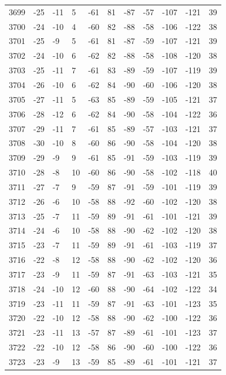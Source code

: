 \begin{table}[H]
\begin{tabular}{lllllllllll}
3699 & -25 & -11 & 5 & -61 & 81 & -87 & -57 & -107 & -121 & 39 \\
3700 & -24 & -10 & 4 & -60 & 82 & -88 & -58 & -106 & -122 & 38 \\
3701 & -25 & -9 & 5 & -61 & 81 & -87 & -59 & -107 & -121 & 39 \\
3702 & -24 & -10 & 6 & -62 & 82 & -88 & -58 & -108 & -120 & 38 \\
3703 & -25 & -11 & 7 & -61 & 83 & -89 & -59 & -107 & -119 & 39 \\
3704 & -26 & -10 & 6 & -62 & 84 & -90 & -60 & -106 & -120 & 38 \\
3705 & -27 & -11 & 5 & -63 & 85 & -89 & -59 & -105 & -121 & 37 \\
3706 & -28 & -12 & 6 & -62 & 84 & -90 & -58 & -104 & -122 & 36 \\
3707 & -29 & -11 & 7 & -61 & 85 & -89 & -57 & -103 & -121 & 37 \\
3708 & -30 & -10 & 8 & -60 & 86 & -90 & -58 & -104 & -120 & 38 \\
3709 & -29 & -9 & 9 & -61 & 85 & -91 & -59 & -103 & -119 & 39 \\
3710 & -28 & -8 & 10 & -60 & 86 & -90 & -58 & -102 & -118 & 40 \\
3711 & -27 & -7 & 9 & -59 & 87 & -91 & -59 & -101 & -119 & 39 \\
3712 & -26 & -6 & 10 & -58 & 88 & -92 & -60 & -102 & -120 & 38 \\
3713 & -25 & -7 & 11 & -59 & 89 & -91 & -61 & -101 & -121 & 39 \\
3714 & -24 & -6 & 10 & -58 & 88 & -90 & -62 & -102 & -120 & 38 \\
3715 & -23 & -7 & 11 & -59 & 89 & -91 & -61 & -103 & -119 & 37 \\
3716 & -22 & -8 & 12 & -58 & 88 & -90 & -62 & -102 & -120 & 36 \\
3717 & -23 & -9 & 11 & -59 & 87 & -91 & -63 & -103 & -121 & 35 \\
3718 & -24 & -10 & 12 & -60 & 88 & -90 & -64 & -102 & -122 & 34 \\
3719 & -23 & -11 & 11 & -59 & 87 & -91 & -63 & -101 & -123 & 35 \\
3720 & -22 & -10 & 12 & -58 & 88 & -90 & -62 & -100 & -122 & 36 \\
3721 & -23 & -11 & 13 & -57 & 87 & -89 & -61 & -101 & -123 & 37 \\
3722 & -22 & -10 & 12 & -58 & 86 & -90 & -60 & -100 & -122 & 36 \\
3723 & -23 & -9 & 13 & -59 & 85 & -89 & -61 & -101 & -121 & 37 \\

\end{tabular}
\end{table}
